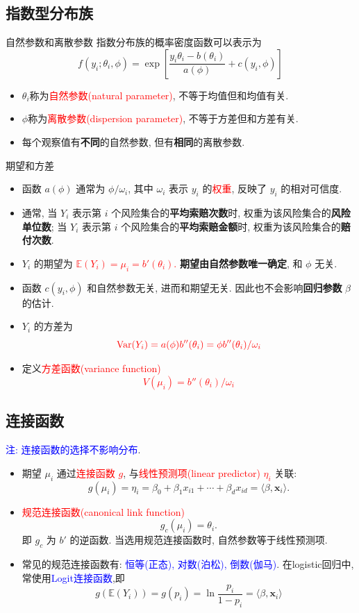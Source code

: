\documentclass[professionalfont]{beamer}
\def\E{{\mathbb E}}  %
\def\bx{\boldsymbol{x}}
\newcommand{\red}[1]{\textcolor{red}{#1}}
\newcommand{\blue}[1]{\textcolor{blue}{#1}}
\begin{document}
\subsection{指数型分布族}
\begin{frame}{自然参数和离散参数}
	指数分布族的概率密度函数可以表示为
	$$f(y_i;\theta_i,\phi)=\exp\left[\frac{y_i\theta_i-b(\theta_i)}{a(\phi)}+c(y_i,\phi)\right]$$
\begin{itemize}
\item $\theta_i$称为\red{自然参数(natural parameter)}, 不等于均值但和均值有关. 
\item $\phi$称为\red{离散参数(dispersion parameter)}, 不等于方差但和方差有关.
\item 每个观察值有\textbf{不同}的自然参数, 但有\textbf{相同}的离散参数.
\end{itemize}
\end{frame}
\begin{frame}{期望和方差}
	\begin{itemize}
	\item 函数 $a(\phi)$ 通常为 $\phi/\omega_{i}$, 其中 $\omega_i$ 表示 $y_i$ 的\red{权重}, 反映了 $y_i$ 的相对可信度.
	\item 通常, 当 $Y_i$ 表示第 $i$ 个风险集合的\textbf{平均索赔次数}时, 权重为该风险集合的\textbf{风险单位数}; 当 $Y_i$ 表示第 $i$ 个风险集合的\textbf{平均索赔金额}时, 权重为该风险集合的\textbf{赔付次数}.
	\item $Y_i$ 的期望为 \red{$\E(Y_i)=\mu_i=b'(\theta_i).$} \textbf{期望由自然参数唯一确定}, 和 $\phi$ 无关.
	\item 函数 $c(y_i,\phi)$ 和自然参数无关, 进而和期望无关. 因此也不会影响\textbf{回归参数} $\beta$ 的估计.
	\item $Y_i$ 的方差为$$\red{\text{Var}(Y_i)=a(\phi)b''(\theta_i)=\phi b''(\theta_i)/\omega_i}$$
	\item 定义\red{方差函数(variance function)}\red{$$V(\mu_i)=b''(\theta_i)/\omega_i$$}	
\end{itemize}
\end{frame}
\subsection{连接函数}
\begin{frame}
	\blue{注: 连接函数的选择不影响分布}.

	\begin{itemize}
	\item 期望 $\mu_i$ 通过\red{连接函数 $g$}, 与\red{线性预测项(linear predictor) $\eta_i$} 关联: 
	$$g(\mu_i)=\eta_i=\beta_0+\beta_1x_{i1}+\cdots+\beta_dx_{id}=\langle\beta,\bx_i\rangle.$$	
	\item \red{规范连接函数(canonical link function)} $$g_c(\mu_i)=\theta_i.$$
	即 $g_c$ 为 $b'$ 的逆函数. 当选用规范连接函数时, 自然参数等于线性预测项.
	\item 常见的规范连接函数有: \blue{恒等(正态), 对数(泊松), 倒数(伽马)}. 在logistic回归中, 常使用\blue{Logit连接函数},即
	$$g(\E(Y_i))=g(p_i)=\ln \frac{p_i}{1-p_i}=\langle\beta,\bx_i\rangle$$
	\end{itemize}
\end{frame}
\end{document}
